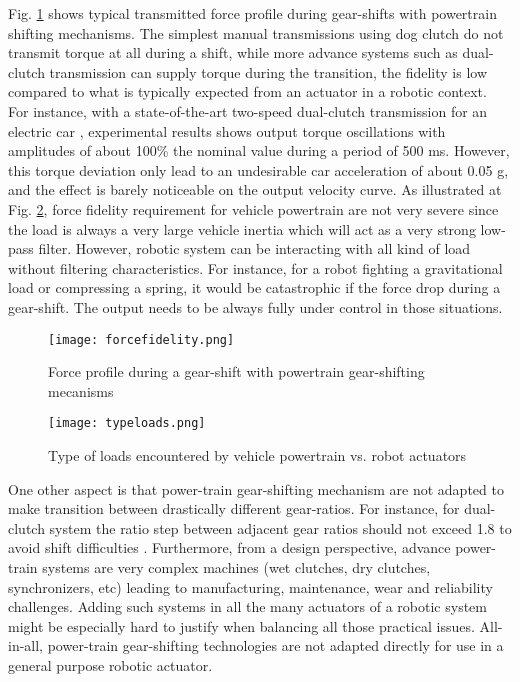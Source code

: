 Fig. \ref{fig:forcefidelity} shows typical transmitted force profile during gear-shifts with powertrain shifting mechanisms. The simplest manual transmissions using dog clutch do not transmit torque at all during a shift, while more advance systems such as dual-clutch transmission can supply torque during the transition, the fidelity is low compared to what is typically expected from an actuator in a robotic context. For instance, with a state-of-the-art two-speed dual-clutch transmission for an electric car \cite{walker_powertrain_2017}, experimental results shows output torque oscillations with amplitudes of about 100\% the nominal value during a period of 500 ms. However, this torque deviation only lead to an undesirable car acceleration of about 0.05 g, and the effect is barely noticeable on the output velocity curve. As illustrated at Fig. \ref{fig:typeloads}, force fidelity requirement for vehicle powertrain are not very severe since the load is always a very large vehicle inertia which will act as a very strong low-pass filter. However, robotic system can be interacting with all kind of load without filtering characteristics. For instance, for a robot fighting a gravitational load or compressing a spring, it would be catastrophic if the force drop during a gear-shift. The output needs to be always fully under control in those situations. 

\begin{figure}[htp]
	\centering
		\texttt{[image: forcefidelity.png]}
	\caption{Force profile during a gear-shift with powertrain gear-shifting mecanisms}
	\label{fig:forcefidelity}
\end{figure}

\begin{figure}[htp]
	\centering
		\texttt{[image: typeloads.png]}
	\caption{Type of loads encountered by vehicle powertrain vs. robot actuators}
	\label{fig:typeloads}
\end{figure}

One other aspect is that power-train gear-shifting mechanism are not adapted to make transition between drastically different gear-ratios. For instance, for dual-clutch system the ratio step between adjacent gear ratios should not exceed 1.8 to avoid shift difficulties \cite{gao_gear_2015}. Furthermore, from a design perspective, advance power-train systems are very complex machines (wet clutches, dry clutches, synchronizers, etc) leading to manufacturing, maintenance, wear and reliability challenges. Adding such systems in all the many actuators of a robotic system might be especially hard to justify when balancing all those practical issues. All-in-all, power-train gear-shifting technologies are not adapted directly for use in a general purpose robotic actuator.

